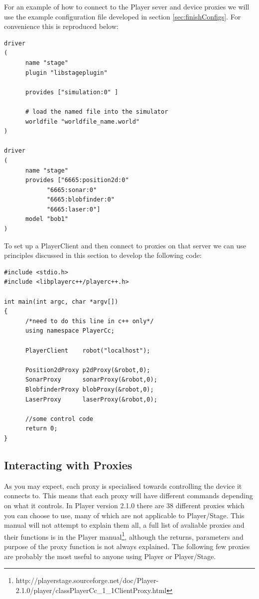 \documentclass[a4paper]{article}
\newcommand{\plst}{Player/Stage\xspace}
\newcommand{\pl}{Player\xspace}
\begin{document}
For an example of how to connect to the \pl sever and device proxies we will use the example configuration file developed in section \ref{sec:finishConfigs}. For convenience this is reproduced below:
\begin{verbatim}
driver
(		
      name "stage"
      plugin "libstageplugin"

      provides ["simulation:0" ]

      # load the named file into the simulator
      worldfile "worldfile_name.world"	
)      

driver
(
      name "stage"
      provides ["6665:position2d:0" 
            "6665:sonar:0" 
            "6665:blobfinder:0" 
            "6665:laser:0"]
      model "bob1" 
)
\end{verbatim}
To set up a PlayerClient and then connect to proxies on that server we can use principles discussed in this section to develop the following code:
\begin{verbatim}
#include <stdio.h>
#include <libplayerc++/playerc++.h>

int main(int argc, char *argv[])
{
      /*need to do this line in c++ only*/
      using namespace PlayerCc;
	
      PlayerClient    robot("localhost");

      Position2dProxy p2dProxy(&robot,0);
      SonarProxy      sonarProxy(&robot,0);
      BlobfinderProxy blobProxy(&robot,0);
      LaserProxy      laserProxy(&robot,0);

      //some control code
      return 0;
}
\end{verbatim}

\subsection{Interacting with Proxies}\label{sec:interactingwithproxies}

As you may expect, each proxy is specialised towards controlling the device it connects to. This means that each proxy will have different commands depending on what it controls. 
In Player version 2.1.0 there are 38 different proxies which you can choose to use, many of which are not applicable to \plst. This manual will not attempt to explain them all, a full list of avaliable proxies and their functions is in the \pl manual\footnote{http://playerstage.sourceforge.net/doc/Player-2.1.0/player/classPlayerCc\_1\_1ClientProxy.html}, although the returns, parameters and purpose of the proxy function is not always explained. 
\newline The following few proxies are probably the most useful to anyone using \pl or \plst.
\end{document}
